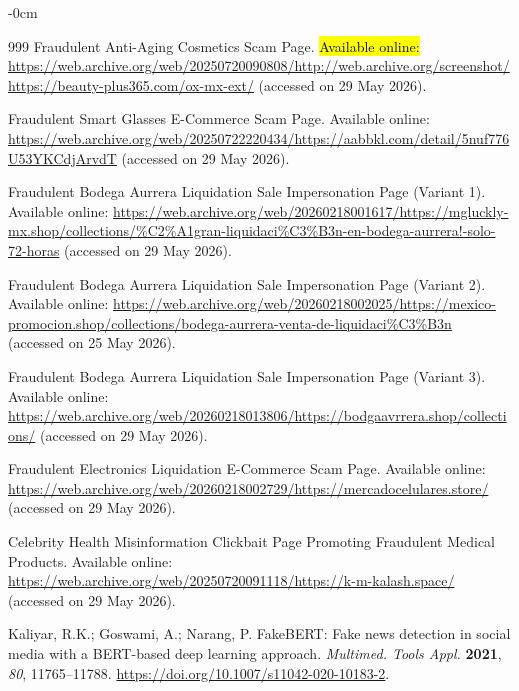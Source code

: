 \documentclass[informatics,article,accept,pdftex,moreauthors]{Definitions/mdpi}
\begin{document}
\begin{adjustwidth}{-\extralength}{0cm}
\begin{thebibliography}{999}
Fraudulent Anti-Aging Cosmetics Scam Page. \hl{Available online:} {\url{https://web.archive.org/web/20250720090808/http://web.archive.org/screenshot/https://beauty-plus365.com/ox-mx-ext/}} (accessed on 29 May 2026). %
 
Fraudulent Smart Glasses E-Commerce Scam Page. Available online: \url{https://web.archive.org/web/20250722220434/https://aabbkl.com/detail/5nuf776U53YKCdjArvdT} (accessed on 29 May 2026).
 
Fraudulent Bodega Aurrera Liquidation Sale Impersonation Page (Variant 1). Available online: \url{https://web.archive.org/web/20260218001617/https://mgluckly-mx.shop/collections/\%C2\%A1gran-liquidaci\%C3\%B3n-en-bodega-aurrera!-solo-72-horas} \linebreak  (accessed on 29 May 2026).
 
Fraudulent Bodega Aurrera Liquidation Sale Impersonation Page (Variant 2). Available online: \url{https://web.archive.org/web/20260218002025/https://mexico-promocion.shop/collections/bodega-aurrera-venta-de-liquidaci\%C3\%B3n} (accessed on 25 \linebreak  May 2026).
 
Fraudulent Bodega Aurrera Liquidation Sale Impersonation Page (Variant 3). Available online: \url{https://web.archive.org/web/20260218013806/https://bodgaavrrera.shop/collections/} (accessed on 29 May 2026).
 
Fraudulent Electronics Liquidation E-Commerce Scam Page. Available online: \url{https://web.archive.org/web/20260218002729/https://mercadocelulares.store/} (accessed on 29 May 2026).
 
Celebrity Health Misinformation Clickbait Page Promoting Fraudulent Medical Products. Available online: \url{https://web.archive.org/web/20250720091118/https://k-m-kalash.space/} (accessed on 29 May 2026).
 
Kaliyar, R.K.; Goswami, A.; Narang, P. FakeBERT: Fake news detection in social media with a BERT-based deep learning approach. \textit{Multimed. Tools Appl.} \textbf{2021}, \textit{80}, 11765--11788. \href{https://doi.org/10.1007/s11042-020-10183-2}{https://doi.org/10.1007/s11042-020-10183-2}.
 

\end{thebibliography}
\end{adjustwidth}
\end{document}
